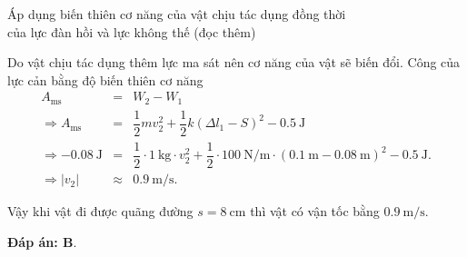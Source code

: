 \begin{dang}{Áp dụng biến thiên cơ năng của vật chịu tác dụng đồng thời \\của lực đàn hồi và lực không thế (đọc thêm)}
{		Do vật chịu tác dụng thêm lực ma sát nên cơ năng của vật sẽ biến đổi. Công của lực cản bằng độ biến thiên cơ năng
		\begin{eqnarray*}
			A_\text{ms}&=&W_2-W_1\\
			\Rightarrow A_\text{ms}&=&\dfrac{1}{2}mv_2^2+\dfrac{1}{2}k(\Delta l_1 - S)^2-\SI{0,5}{\joule}\\
			\Rightarrow \SI{-0,08}{\joule}&=&\dfrac{1}{2}\cdot\SI{1}{\kilogram}\cdot v_2^2+\dfrac{1}{2}\cdot \SI{100}{\newton/\meter}\cdot (\SI{0,1}{\meter} - \SI{0,08}{\meter})^2-\SI{0,5}{\joule}.\\
			\Rightarrow \left|v_2\right|  &\approx& \SI{0,9}{\meter/\second}.
		\end{eqnarray*}
		
		Vậy khi vật đi được quãng đường $s=\SI{8}{\centi\meter}$ thì vật có vận tốc bằng $\SI{0,9}{\meter/\second}$.
		
		\textbf{Đáp án: B}.
	}
\end{dang}

